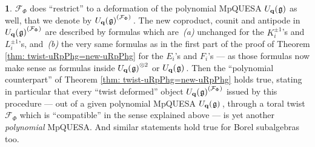 \documentclass[12pt,reqno,twoside,a4paper]{amsart}
\numberwithin{equation}{section}
\theoremstyle{definition}
\newtheorem{free text}[lema]{}
\theoremstyle{remark}
\newcommand{\F}{{\mathcal F}}
\def \bq {\mathbf{q}}
\def \lieg{\mathfrak{g}}
\def \Ubqg {U_{\bq}(\hskip0,5pt\lieg)}
\theoremstyle{plain}
\begin{document}
\begin{free text}
   $ \F_\Phi $  does ``restrict'' to a deformation of the polynomial MpQUESA
   $ \Ubqg $  as well, that we denote by  $ {\Ubqg}^{(\F_\Phi)} \, $.
   The new coproduct, counit and antipode in  $ {\Ubqg}^{(\F_\Phi)} $
   are described by formulas which are\,  \textit{(a)\/}  unchanged for the
   $ K_i^{\pm 1} $'s  and  $ L_i^{\pm 1} $'s,  and\,  \textit{(b)\/}
   the very same formulas as in the first part of the proof of
   Theorem \ref{thm: twist-uRpPhg=new-uRpPhg}  for the  $ E_i $'s  and
   $ F_i $'s   --- as those formulas now make sense as formulas inside
   $ {\Ubqg}^{\otimes 2} $  or  $ \Ubqg \, $.  Then the
   ``polynomial counterpart'' of  Theorem \ref{thm: twist-uRpPhg=new-uRpPhg}
   holds true, stating in particular that every ``twist deformed'' object
   $ {\Ubqg}^{(\F_\Phi)} $  issued by this procedure   --- out of a given
   polynomial MpQUESA  $ \Ubqg \, $,  through a toral twist  $ \F_\Phi $
   which is ``compatible'' in the sense explained above ---
   is yet another  \textsl{polynomial\/}  MpQUESA.  And similar
   statements hold true for Borel subalgebras too.
%
\end{free text}

\vskip13pt
\end{document}

